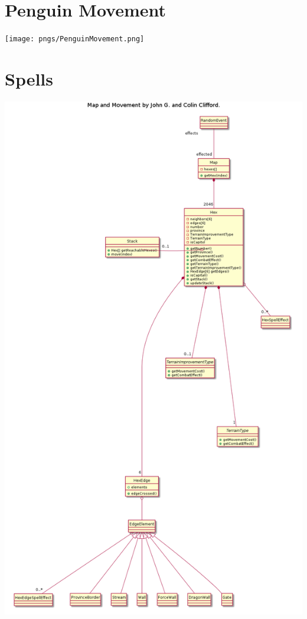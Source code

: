 \documentclass{article}
\begin{document}
\section{Penguin Movement}
\texttt{[image: pngs/PenguinMovement.png]}

\section{Spells}
\includegraphics[width=\textwidth]{pngs/Map.png}
\end{document}
